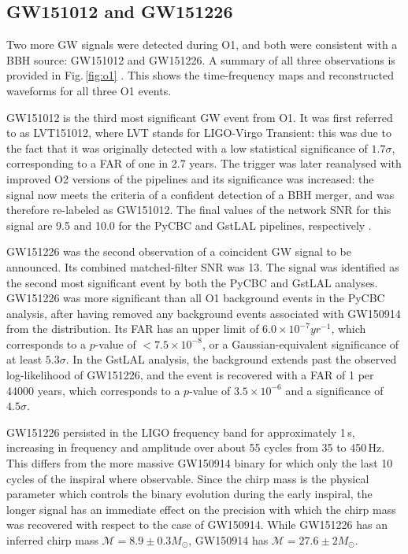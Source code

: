 \documentclass[binding=0.6cm, LaM]{sapthesis}
\begin{document}
\subsection{GW151012 and GW151226}
	Two more GW signals were detected during O1, and both were consistent with a BBH source: 
	GW151012 and GW151226.
	A summary of all three observations is provided in Fig.\,\ref{fig:o1} \cite{13}.
	This shows the time-frequency maps and reconstructed waveforms for all three O1 events.

	GW151012 is the third most significant GW event from O1.
	It was first referred to as LVT151012, where LVT stands for LIGO-Virgo Transient: 
	this was due to the fact that it was originally detected with a low statistical significance of $1.7\sigma$, 
	corresponding to a FAR of one in 2.7 years.
	The trigger was later reanalysed with improved O2 versions of the pipelines and its significance was increased: 
	the signal now meets the criteria of a confident detection of a BBH merger, 
	and was therefore re-labeled as GW151012.
	The final values of the network SNR for this signal are 9.5 and 10.0 
	for the {\ttfamily PyCBC} and {\ttfamily GstLAL} pipelines, respectively \cite{13}.

	GW151226 was the second observation of a coincident GW signal to be announced. 
	Its combined matched-filter SNR was 13. 
	The signal was identified as the second most significant event by both the {\ttfamily PyCBC} and {\ttfamily GstLAL} analyses.
	GW151226 was more significant than all O1 background events in the {\ttfamily PyCBC} analysis, 
	after having removed any background events associated with GW150914 from the distribution.
	Its FAR has an upper limit of $6.0 \times 10^{-7} yr^{-1}$, which
        corresponds to a $p$-value of $< 7.5 \times 10^{-8}$, or a Gaussian-equivalent significance of at least $5.3\sigma$. 
	In the {\ttfamily GstLAL} analysis, the background extends past the observed log-likelihood of GW151226, 
	and the event is recovered with a FAR of 1 per 44000 years, which corresponds to a $p$-value of $3.5\times 10^{-6}$ and a significance of $4.5\sigma$.

	GW151226 persisted in the LIGO frequency band for approximately 1\,s, 
	increasing in frequency and amplitude over about 55 cycles from 35 to 450\,Hz. 
	This differs from the more massive GW150914 binary for which only the last 10 cycles of the inspiral where observable.
	Since the chirp mass is the physical parameter which controls the binary evolution during the early inspiral, 
	the longer signal has an immediate effect on the precision 
	with which the chirp mass \cite{98,126} was recovered with respect to the case of GW150914.
	While GW151226 has an inferred chirp mass $\mathcal{M}=8.9\pm 0.3 M_\odot$,
	GW150914 has $\mathcal{M}=27.6\pm 2  M_\odot$.
\end{document}

